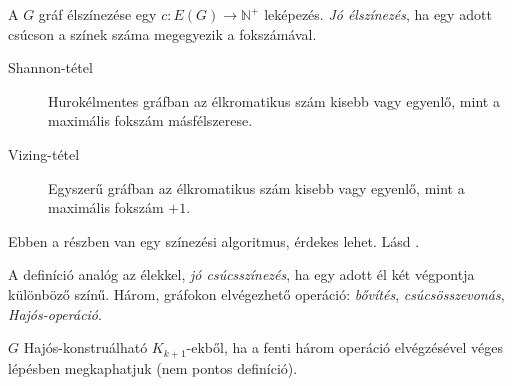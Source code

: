 \documentclass[DIV=15,appendixprefix]{scrreprt}
\theoremstyle{definition}
\theoremstyle{remark}
\begin{document}
A $ G $ gráf élszínezése egy $ c \colon E \left( G \right) \rightarrow \mathbb{N}^{+} $ leképezés.
\emph{Jó élszínezés}, ha egy adott csúcson a színek száma megegyezik a fokszámával.
\begin{description}
	\item[Shannon-tétel] Hurokélmentes gráfban az élkromatikus szám kisebb vagy egyenlő, mint a
		maximális fokszám másfélszerese.
	\item[Vizing-tétel] Egyszerű gráfban az élkromatikus szám kisebb vagy egyenlő, mint a maximális
		fokszám $ + 1 $.
\end{description}
Ebben a részben van egy színezési algoritmus, érdekes lehet.
%
Lásd
\cite[\href{http://www.math.u-szeged.hu/~hajnal/courses/MSc_Diszkret/MSc_kombi13/ea-Hajos.pdf}{%
\emph{Gráfok csúcsszínezései I. -
 tétele}}]{DiMat}.

A definíció analóg az élekkel, \emph{jó csúcsszínezés}, ha egy adott él két végpontja különböző
színű. Három, gráfokon elvégezhető operáció: \emph{bővítés}, \emph{csúcsösszevonás},
\emph{Hajós-operáció}.

$ G $ Hajós-konstruálható $ K_{k+1} $-ekből, ha a fenti három operáció elvégzésével véges lépésben
megkaphatjuk (nem pontos definíció).
\end{document}
